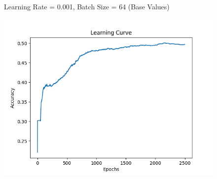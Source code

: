 \documentclass[12pt]{article}
\begin{document}
\begin{figure}[H]
    \centering
    Learning Rate = 0.001, Batch Size = 64 (Base Values)
    \begin{minipage}{0.45\textwidth}
        \includegraphics[width=\textwidth]{Base.png}
    \end{minipage}


\end{figure}
\end{document}
